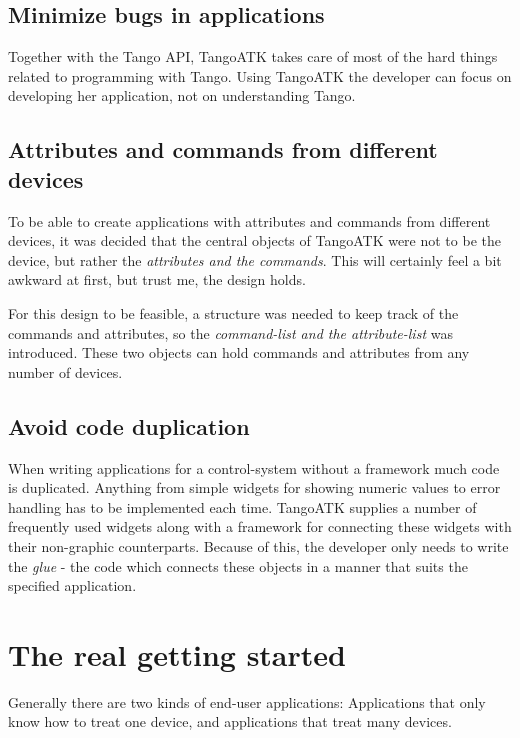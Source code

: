 \subsection{Minimize bugs in applications}

Together with the Tango API, TangoATK takes care of most of the hard
things related to programming with Tango. Using TangoATK the developer
can focus on developing her application, not on understanding Tango.


\subsection{Attributes and commands from different devices}

To be able to create applications with attributes
and commands from different devices, it was decided
that the central objects of TangoATK were not to be the device,
but rather the \emph{attributes and the commands}. This will certainly
feel a bit awkward at first, but trust me, the design holds.

For this design to be feasible, a structure was needed to keep track
of the commands and attributes, so the \emph{command-list
and the attribute-list} was introduced. These
two objects can hold commands and attributes from any number of devices.


\subsection{Avoid code duplication}

When writing applications for a control-system without a framework
much code is duplicated. Anything from simple widgets for showing
numeric values to error handling has to be implemented each time.
TangoATK supplies a number of frequently used widgets along with a
framework for connecting these widgets with their non-graphic counterparts.
Because of this, the developer only needs to write the \emph{glue}
- the code which connects these objects in a manner that suits the
specified application.


\section{The real getting started}

Generally there are two kinds of end-user applications: Applications
that only know how to treat one device, and applications that treat
many devices.


